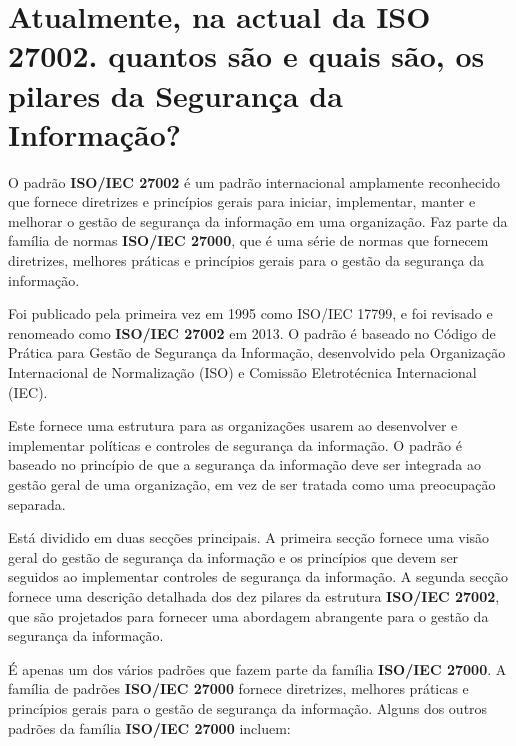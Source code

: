 \section[Pergunta 2]{Atualmente, na actual da \textbf{ISO 27002}. quantos são e quais são, os pilares da Segurança da Informação?}

O padrão \textbf{\textbf{ISO/IEC 27002}} é um padrão internacional amplamente reconhecido que fornece diretrizes e princípios gerais para iniciar, implementar, manter e melhorar o gestão de segurança da informação em uma organização. Faz parte da família de normas \textbf{ISO/IEC 27000}, que é uma série de normas que fornecem diretrizes, melhores práticas e princípios gerais para o gestão da segurança da informação.

Foi publicado pela primeira vez em 1995 como ISO/IEC 17799, e foi revisado e renomeado como \textbf{ISO/IEC 27002} em 2013. O padrão é baseado no Código de Prática para Gestão de Segurança da Informação, desenvolvido pela Organização Internacional de Normalização (ISO) e Comissão Eletrotécnica Internacional (IEC).

Este fornece uma estrutura para as organizações usarem ao desenvolver e implementar políticas e controles de segurança da informação. O padrão é baseado no princípio de que a segurança da informação deve ser integrada ao gestão geral de uma organização, em vez de ser tratada como uma preocupação separada.

Está dividido em duas secções principais. A primeira secção fornece uma visão geral do gestão de segurança da informação e os princípios que devem ser seguidos ao implementar controles de segurança da informação. A segunda secção fornece uma descrição detalhada dos dez pilares da estrutura \textbf{ISO/IEC 27002}, que são projetados para fornecer uma abordagem abrangente para o gestão da segurança da informação.

É apenas um dos vários padrões que fazem parte da família \textbf{ISO/IEC 27000}. A família de padrões \textbf{ISO/IEC 27000} fornece diretrizes, melhores práticas e princípios gerais para o gestão de segurança da informação. Alguns dos outros padrões da família \textbf{ISO/IEC 27000} incluem:

